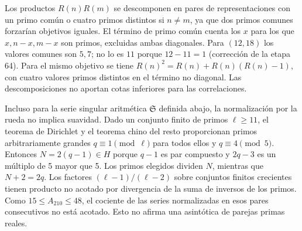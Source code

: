 \documentclass[11pt,a4paper]{article}
\newcommand{\B}[2]{#2}
\newcommand{\B}[2]{#1}
\newcommand{\Sg}{\mathfrak S}
\begin{document}
\B{The products $R(n)R(m)$ split into pairs of representations with one common prime or with four distinct primes for $n\ne m$, since two common primes would force equal targets. The shared-prime term is the count of $x$ with $x,n-x,m-x$ prime and both diagonals excluded. For $(12,18)$ the shared positions are $5,7$; $11$ is not one because $12-11=1$ (the stage 64 erratum). At the same target the identity is $R(n)^2=R(n)+R(n)(R(n)-1)$, with the off-diagonal term having four distinct prime values. These decompositions do not supply lower bounds for the correlations.}{Los productos $R(n)R(m)$ se descomponen en pares de representaciones con un primo común o cuatro primos distintos si $n\ne m$, ya que dos primos comunes forzarían objetivos iguales. El término de primo común cuenta los $x$ para los que $x,n-x,m-x$ son primos, excluidas ambas diagonales. Para $(12,18)$ los valores comunes son $5,7$; no lo es $11$ porque $12-11=1$ (corrección de la etapa 64). Para el mismo objetivo se tiene $R(n)^2=R(n)+R(n)(R(n)-1)$, con cuatro valores primos distintos en el término no diagonal. Las descomposiciones no aportan cotas inferiores para las correlaciones.}

\B{Even at the level of the arithmetic singular series $\Sg$ defined below, wheel normalization does not imply smoothness. For a finite set of primes $\ell\ge11$, Dirichlet's theorem and CRT provide arbitrarily large primes $q\equiv1\pmod\ell$ for all these primes and $q\equiv4\pmod5$. Then $N=2(q-1)\in H$ since $q-1$ is even composite and $2q-3$ is a multiple of 5 greater than 5. The selected primes divide $N$, whereas $N+2=2q$. The factors $(\ell-1)/(\ell-2)$ over growing finite sets have unbounded product by divergence of the sum of reciprocal primes. Since $15\le A_{210}\le48$, the ratio of the wheel-normalized singular series at these consecutive even arguments is unbounded. This is not a claim about actual prime-pair asymptotics.}{Incluso para la serie singular aritmética $\Sg$ definida abajo, la normalización por la rueda no implica suavidad. Dado un conjunto finito de primos $\ell\ge11$, el teorema de Dirichlet y el teorema chino del resto proporcionan primos arbitrariamente grandes $q\equiv1\pmod\ell$ para todos ellos y $q\equiv4\pmod5$. Entonces $N=2(q-1)\in H$ porque $q-1$ es par compuesto y $2q-3$ es un múltiplo de 5 mayor que 5. Los primos elegidos dividen $N$, mientras que $N+2=2q$. Los factores $(\ell-1)/(\ell-2)$ sobre conjuntos finitos crecientes tienen producto no acotado por divergencia de la suma de inversos de los primos. Como $15\le A_{210}\le48$, el cociente de las series normalizadas en esos pares consecutivos no está acotado. Esto no afirma una asintótica de parejas primas reales.}
\end{document}

